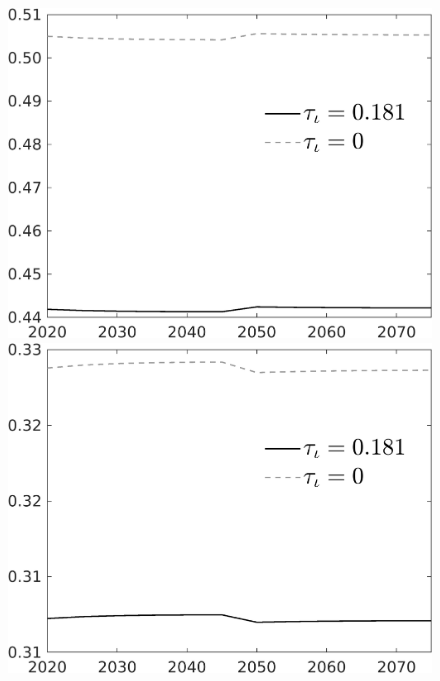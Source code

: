 \documentclass[12pt]{article}
\begin{document}
\begin{figure}[h!!]
\begin{minipage}[]{0.32\textwidth}
	\end{minipage}	
	\begin{minipage}[]{0.32\textwidth}
		\includegraphics[width=1\textwidth]{../../codding_model/own_basedOnFried/optimalPol_010922_revision/figures/all_13Sept22/CompTauf_bytaul_Equlab_Reg0_hh_spillover0_nsk0_xgr0_knspil0_sep0_LFlimit1_emsbase0_countec0_GovRev0_etaa0.79_lgd1.png}
	\end{minipage}	
	\begin{minipage}[]{0.32\textwidth}
		\includegraphics[width=1\textwidth]{../../codding_model/own_basedOnFried/optimalPol_010922_revision/figures/all_13Sept22/CompTauf_bytaul_Equlab_Reg0_hl_spillover0_nsk0_xgr0_knspil0_sep0_LFlimit1_emsbase0_countec0_GovRev0_etaa0.79_lgd1.png}

\end{minipage}
\end{figure}
\end{document}
